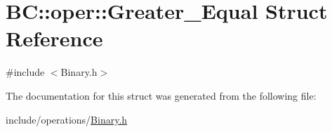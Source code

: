 \hypertarget{structBC_1_1oper_1_1Greater__Equal}{}\section{BC\+:\+:oper\+:\+:Greater\+\_\+\+Equal Struct Reference}
\label{structBC_1_1oper_1_1Greater__Equal}


{\ttfamily \#include $<$Binary.\+h$>$}



The documentation for this struct was generated from the following file\+:\begin{DoxyCompactItemize}
\item 
include/operations/\hyperlink{Binary_8h}{Binary.\+h}\end{DoxyCompactItemize}
